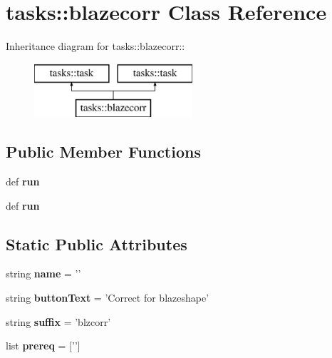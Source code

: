 \section{tasks::blazecorr Class Reference}
\label{classtasks_1_1blazecorr}
Inheritance diagram for tasks::blazecorr::\begin{figure}[H]
\begin{center}
\leavevmode
\includegraphics[height=2cm]{classtasks_1_1blazecorr}
\end{center}
\end{figure}
\subsection*{Public Member Functions}
\begin{CompactItemize}
\item 
def \textbf{run}\label{classtasks_1_1blazecorr_cbf816168701d529dfbad7d281989b5e}

\item 
def \textbf{run}\label{classtasks_1_1blazecorr_cbf816168701d529dfbad7d281989b5e}

\end{CompactItemize}
\subsection*{Static Public Attributes}
\begin{CompactItemize}
\item 
string \textbf{name} = '{\bfblazecorr}'\label{classtasks_1_1blazecorr_5d0a45f69faa7facb9aab8624d9b30ef}

\item 
string \textbf{button\-Text} = 'Correct for blazeshape'\label{classtasks_1_1blazecorr_34011eb4e7330133c7f30a957c8b0a5d}

\item 
string \textbf{suffix} = 'blzcorr'\label{classtasks_1_1blazecorr_53d0151385808cb5ac8d06a7ede50030}

\item 
list \textbf{prereq} = ['{\bfextspec}']\label{classtasks_1_1blazecorr_12a5ab82b194d94af517d77350c34feb}

\end{CompactItemize}


